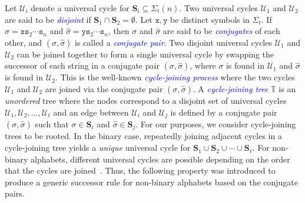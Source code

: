 \documentclass[US-letter,USenglish,authorcolumns,autoref]{lipics-v2021}
\renewcommand{\tt} {\mathtt}
\newcommand{\bS}{\mathbf{S}}
\newcommand{\defo}[1] {\emph{\textcolor{blue}{#1}}}
\begin{document}
Let $\mathcal{U}_i$ denote a universal cycle for $\mathbf{S}_i \subseteq \Sigma_t(n)$. Two universal cycles $\mathcal{U}_1$ and $\mathcal{U}_2$ are said to be \defo{disjoint} if $\mathbf{S}_1 \cap \mathbf{S}_2 = \emptyset$.
Let $\tt{x},\tt{y}$ be distinct symbols in $\Sigma_t$.
If $\sigma = \tt{x}\tt{s}_2\cdots \tt{s}_n$ and $\hat \sigma = \tt{y}\tt{s}_2\cdots \tt{s}_n$, then $\sigma$ and $\hat \sigma$ are said to be \defo{conjugates} of each other, and $(\sigma, \hat \sigma)$ is called a \defo{conjugate pair}.   Two disjoint universal cycles $\mathcal{U}_1$ and $\mathcal{U}_2$ can be joined together to form a single universal cycle by swapping the successor of each string in a conjugate pair $(\sigma, \hat \sigma)$, where $\sigma$ is found in $\mathcal{U}_1$ and $\hat \sigma$ is found in $\mathcal{U}_2$.  This is the well-known \defo{cycle-joining process} where the two cycles $\mathcal{U}_1$ and $\mathcal{U}_2$ are joined via the conjugate pair $(\sigma, \hat \sigma)$.
%
A \defo{cycle-joining tree} $\mathbb{T}$  is an \emph{unordered} tree where 
the nodes correspond to a disjoint set of universal cycles $\mathcal{U}_1, \mathcal{U}_2, \ldots, \mathcal{U}_\ell$ and an edge between $\mathcal{U}_i$ and $\mathcal{U}_j$ is defined by a conjugate pair $(\sigma, \hat \sigma)$ such that $\sigma \in \mathbf{S}_i$ and $\hat \sigma \in \mathbf{S}_j$. 
For our purposes, we consider cycle-joining trees to be rooted.  
%
In the binary case, repeatedly joining adjacent cycles in a cycle-joining tree yields a \emph{unique} universal cycle for $\bS_1 \cup \bS_2 \cup \cdots \cup \bS_\ell$.  
For non-binary alphabets, different universal cycles are possible depending on the order that the cycles are joined~\cite{concattree}.  Thus, the following property was introduced to produce a generic successor rule for non-binary alphabets based on the conjugate pairs.

\end{document}
